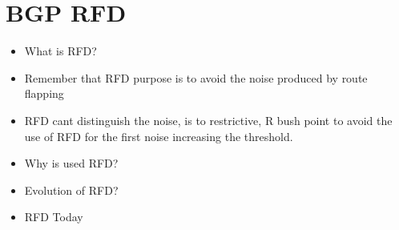 \section{BGP RFD}
\label{sec:bgp_rfd}

\begin{itemize}
    \item What is RFD?
	\item Remember that RFD purpose is to avoid the noise produced
		by route flapping
	\item RFD cant distinguish the noise, is to restrictive, R bush point to
		avoid the use of RFD for the first noise increasing the threshold.
    \item Why is used RFD?
    \item Evolution of RFD?
    \item RFD Today
\end{itemize}
